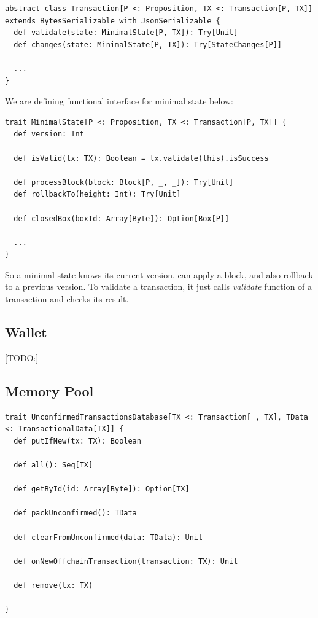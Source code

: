 \documentclass[]{report}   %
\begin{document}
\begin{lstlisting}
abstract class Transaction[P <: Proposition, TX <: Transaction[P, TX]] extends BytesSerializable with JsonSerializable {
  def validate(state: MinimalState[P, TX]): Try[Unit]
  def changes(state: MinimalState[P, TX]): Try[StateChanges[P]]

  ...
}
\end{lstlisting}

We are defining functional interface for minimal state below:

\begin{lstlisting}
trait MinimalState[P <: Proposition, TX <: Transaction[P, TX]] {
  def version: Int

  def isValid(tx: TX): Boolean = tx.validate(this).isSuccess

  def processBlock(block: Block[P, _, _]): Try[Unit]
  def rollbackTo(height: Int): Try[Unit]

  def closedBox(boxId: Array[Byte]): Option[Box[P]]

  ...
}
\end{lstlisting}

So a minimal state knows its current version, can apply a block, and also rollback to a previous version. To validate a transaction, it just calls \textit{validate} function of a transaction and checks its result.

\subsection{Wallet}

[TODO:]

\subsection{Memory Pool}

\begin{lstlisting}
trait UnconfirmedTransactionsDatabase[TX <: Transaction[_, TX], TData <: TransactionalData[TX]] {
  def putIfNew(tx: TX): Boolean

  def all(): Seq[TX]

  def getById(id: Array[Byte]): Option[TX]

  def packUnconfirmed(): TData

  def clearFromUnconfirmed(data: TData): Unit

  def onNewOffchainTransaction(transaction: TX): Unit

  def remove(tx: TX)
  
}
\end{lstlisting}
\end{document}
